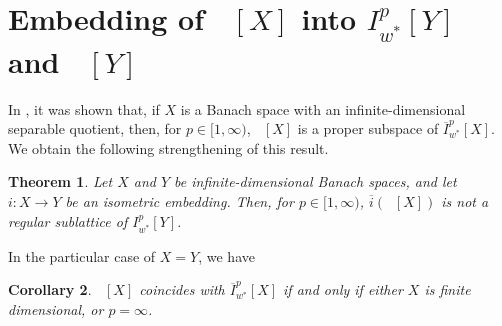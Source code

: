\documentclass{amsart}
\theoremstyle{plain}
\newtheorem{theorem}{Theorem}[section]
\newtheorem{corollary}[theorem]{Corollary}
\theoremstyle{definition}
\numberwithin{equation}{section}
\DeclareMathOperator{\FBLp}{FBL^{\mathit{(p)}}}
\newcommand{\nip}{I_{w^*}^{p}}
\newcommand{\Ip}{\overline{I}_{w^*}^{p}}
\begin{document}
\section{Embedding of $\FBLp[X]$ into $\nip[Y]$ and $\FBLp[Y]$}\label{FBLp into Ip}

In \cite{LaTr}, it was shown that, if $X$ is a Banach space with an infinite-dimensional separable quotient, then, for $p \in [1, \infty)$, $\FBLp[X]$ is a proper subspace of $\Ip[X]$. We obtain the following strengthening of this result. 

\begin{theorem}\label{very irregular}
Let $X$ and $Y$ be infinite-dimensional Banach spaces, and let $i: X \to Y$ be an isometric embedding. Then, for $p \in [1,\infty)$, %
$\overline{i}(\FBLp[X])$ is not a regular sublattice of $\nip[Y]$.
\end{theorem}

In the particular case of $X=Y$, we have

\begin{corollary}
$\FBLp[X]$ coincides with $\Ip[X]$ if and only if either $X$ is finite dimensional, or $p=\infty$.
\end{corollary}
\end{document}
